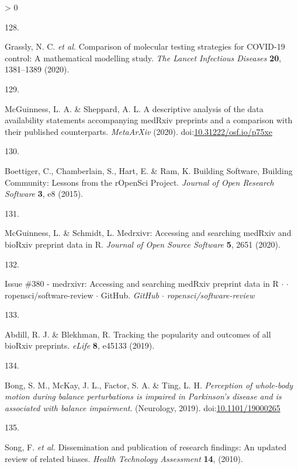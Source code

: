 \documentclass[a4paper, twoside]{templates/ociamthesis}
\newlength{\cslhangindent}
\newlength{\csllabelwidth}
\newenvironment{CSLReferences}[3] %
 {%
  \setlength{\parindent}{0pt}
  \ifodd #1 \everypar{\setlength{\hangindent}{\cslhangindent}}\ignorespaces\fi
  \ifnum #2 > 0
  \setlength{\parskip}{#2\baselineskip}
  \fi
 }%
 {}
\newcommand{\CSLLeftMargin}[1]{\parbox[t]{\maxof{\widthof{#1}}{\csllabelwidth}}{#1}}
\newcommand{\CSLRightInline}[1]{\parbox[t]{\linewidth - \csllabelwidth}{#1}}
\begin{document}
\begin{CSLReferences}{0}{0}
\leavevmode\hypertarget{ref-grassly2020}{}%
\CSLLeftMargin{128. }
\CSLRightInline{Grassly, N. C. \emph{et al.} Comparison of molecular testing strategies for {COVID}-19 control: A mathematical modelling study. \emph{The Lancet Infectious Diseases} \textbf{20}, 1381--1389 (2020).}

\leavevmode\hypertarget{ref-mcguinness2020DAScomparison}{}%
\CSLLeftMargin{129. }
\CSLRightInline{McGuinness, L. A. \& Sheppard, A. L. A descriptive analysis of the data availability statements accompanying {medRxiv} preprints and a comparison with their published counterparts. \emph{MetaArXiv} (2020). doi:\href{https://doi.org/10.31222/osf.io/p75xe}{10.31222/osf.io/p75xe}}

\leavevmode\hypertarget{ref-boettiger2015}{}%
\CSLLeftMargin{130. }
\CSLRightInline{Boettiger, C., Chamberlain, S., Hart, E. \& Ram, K. Building {Software}, {Building Community}: Lessons from the {rOpenSci Project}. \emph{Journal of Open Research Software} \textbf{3}, e8 (2015).}

\leavevmode\hypertarget{ref-mcguinness2020medrxivr}{}%
\CSLLeftMargin{131. }
\CSLRightInline{McGuinness, L. \& Schmidt, L. Medrxivr: Accessing and searching {medRxiv} and {bioRxiv} preprint data in {R}. \emph{Journal of Open Source Software} \textbf{5}, 2651 (2020).}

\leavevmode\hypertarget{ref-zotero-15016}{}%
\CSLLeftMargin{132. }
\CSLRightInline{Issue \#380 - medrxivr: Accessing and searching {medRxiv} preprint data in {R} {\(\cdot\)} {\(\cdot\)} ropensci/software-review {\(\cdot\)} {GitHub}. \emph{GitHub {\(\cdot\)} ropensci/software-review}}

\leavevmode\hypertarget{ref-abdill2019popularity}{}%
\CSLLeftMargin{133. }
\CSLRightInline{Abdill, R. J. \& Blekhman, R. Tracking the popularity and outcomes of all {bioRxiv} preprints. \emph{eLife} \textbf{8}, e45133 (2019).}

\leavevmode\hypertarget{ref-bong2019}{}%
\CSLLeftMargin{134. }
\CSLRightInline{Bong, S. M., McKay, J. L., Factor, S. A. \& Ting, L. H. \emph{Perception of whole-body motion during balance perturbations is impaired in {Parkinson}'s disease and is associated with balance impairment}. ({Neurology}, 2019). doi:\href{https://doi.org/10.1101/19000265}{10.1101/19000265}}

\leavevmode\hypertarget{ref-song2010}{}%
\CSLLeftMargin{135. }
\CSLRightInline{Song, F. \emph{et al.} Dissemination and publication of research findings: An updated review of related biases. \emph{Health Technology Assessment} \textbf{14}, (2010).}


\end{CSLReferences}
\end{document}
